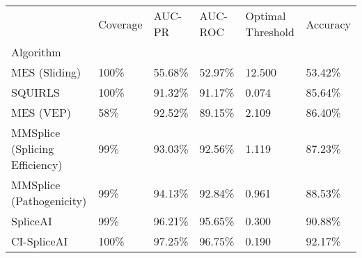 \begin{tabular}{llllll}
\toprule
{} & Coverage &  AUC-PR & AUC-ROC & Optimal Threshold & Accuracy \\
Algorithm                      &          &         &         &                   &          \\
\midrule
MES (Sliding)                  &     100\% &  55.68\% &  52.97\% &            12.500 &   53.42\% \\
SQUIRLS                        &     100\% &  91.32\% &  91.17\% &             0.074 &   85.64\% \\
MES (VEP)                      &      58\% &  92.52\% &  89.15\% &             2.109 &   86.40\% \\
MMSplice (Splicing Efficiency) &      99\% &  93.03\% &  92.56\% &             1.119 &   87.23\% \\
MMSplice (Pathogenicity)       &      99\% &  94.13\% &  92.84\% &             0.961 &   88.53\% \\
SpliceAI                       &      99\% &  96.21\% &  95.65\% &             0.300 &   90.88\% \\
CI-SpliceAI                    &     100\% &  97.25\% &  96.75\% &             0.190 &   92.17\% \\
\bottomrule
\end{tabular}
